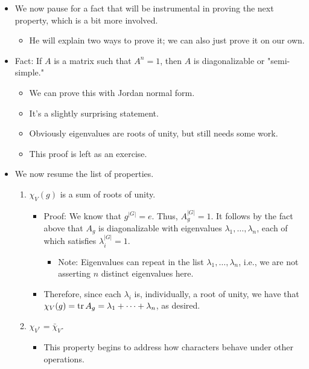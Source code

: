\documentclass[../notes.tex]{subfiles}
\begin{document}
\begin{itemize}
\begin{enumerate}
\begin{itemize}
        \end{itemize}
    \end{enumerate}
    \item We now pause for a fact that will be instrumental in proving the next property, which is a bit more involved.
    \begin{itemize}
        \item He will explain two ways to prove it; we can also just prove it on our own.
    \end{itemize}
    \item Fact: If $A$ is a matrix such that $A^n=1$, then $A$ is diagonalizable or "semi-simple."
    \begin{itemize}
        \item We can prove this with Jordan normal form.
        \item It's a slightly surprising statement.
        \item Obviously eigenvalues are roots of unity, but still needs some work.
        \item This proof is left as an exercise.
    \end{itemize}
    \item We now resume the list of properties.
    \begin{enumerate}[resume]
        \item $\chi_V(g)$ is a sum of roots of unity.
        \begin{itemize}
            \item Proof: We know that $g^{|G|}=e$. Thus, $A_g^{|G|}=1$. It follows by the fact above that $A_g$ is diagonalizable with eigenvalues $\lambda_1,\dots,\lambda_n$, each of which satisfies $\lambda_i^{|G|}=1$.
            \begin{itemize}
                \item Note: Eigenvalues can repeat in the list $\lambda_1,\dots,\lambda_n$, i.e., we are not asserting $n$ distinct eigenvalues here.
            \end{itemize}
            \item Therefore, since each $\lambda_i$ is, individually, a root of unity, we have that $\chi_V(g)=\tr A_g=\lambda_1+\cdots+\lambda_n$, as desired.
        \end{itemize}
        \item $\chi_{V^*}=\bar{\chi}_V$.
        \begin{itemize}
            \item This property begins to address how characters behave under other operations.

\end{itemize}
\end{enumerate}
\end{itemize}
\end{document}
